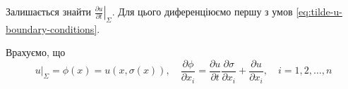 Залишається знайти $\left. \frac{\partial u}{\partial t} \right|_\Sigma$. Для цього диференціюємо першу з умов \eqref{eq:tilde-u-boundary-conditions}. \medskip

Врахуємо, що
\begin{equation}
    \left. u \right|_\Sigma = \phi(x) = u(x, \sigma(x)), \quad \frac{\partial \phi}{\partial x_i} = \frac{\partial u}{\partial t} \frac{\partial \sigma}{\partial x_i} + \frac{\partial u}{\partial x_i}, \quad i = 1, 2, \ldots, n
\end{equation}

